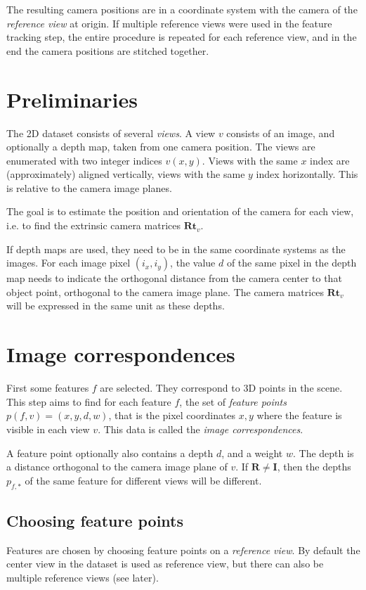 \documentclass{scrreprt}
\newcommand{\matr}[1]{\mathbf{#1}}
\begin{document}
The resulting camera positions are in a coordinate system with the camera of the \emph{reference view} at origin. If multiple reference views were used in the feature tracking step, the entire procedure is repeated for each reference view, and in the end the camera positions are stitched together.



\section{Preliminaries}
The 2D dataset consists of several \emph{views}. A view $v$ consists of an image, and optionally a depth map, taken from one camera position. The views are enumerated with two integer indices $v(x,y)$. Views with the same $x$ index are (approximately) aligned vertically, views with the same $y$ index horizontally. This is relative to the camera image planes.

The goal is to estimate the position and orientation of the camera for each view, i.e. to find the extrinsic camera matrices $\matr{Rt}_v$.

If depth maps are used, they need to be in the same coordinate systems as the images. For each image pixel $(i_x,i_y)$, the value $d$ of the same pixel in the depth map needs to indicate the orthogonal distance from the camera center to that object point, orthogonal to the camera image plane. The camera matrices $\matr{Rt}_v$ will be expressed in the same unit as these depths.

 
\section{Image correspondences}
First some features $f$ are selected. They correspond to 3D points in the scene. This step aims to find for each feature $f$, the set of \emph{feature points} $p(f,v) = (x,y,d,w)$, that is the pixel coordinates $x,y$ where the feature is visible in each view $v$. This data is called the \emph{image correspondences}.

A feature point optionally also contains a depth $d$, and a weight $w$. The depth is a distance orthogonal to the camera image plane of $v$. If $\matr{R} \neq \matr{I}$, then the depths $p_{f,*}$ of the same feature for different views will be different.


\subsection{Choosing feature points}
Features are chosen by choosing feature points on a \emph{reference view}. By default the center view in the dataset is used as reference view, but there can also be multiple reference views (see later).
\end{document}
